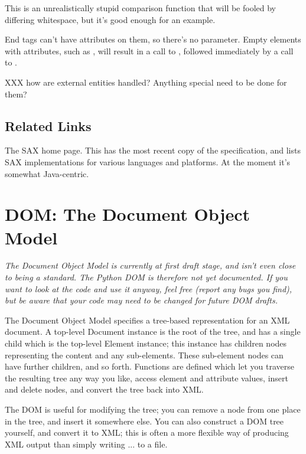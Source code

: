 \documentclass{howto}
\begin{document}
This is an unrealistically stupid comparison function that will be
fooled by differing whitespace, but it's good enough for an example.

End tags can't have attributes on them, so there's no 
parameter.  Empty elements with attributes, such as , will result in a call to
, followed immediately by a call to .

XXX how are external entities handled?  Anything special need to be
done for them?

\subsection{Related Links}

\begin{definitions}
%
The SAX home page.  This has the most recent copy of the
specification, and lists SAX implementations for various languages and
platforms.  At the moment it's somewhat Java-centric.

\end{definitions}

\section{DOM: The Document Object Model}
\label{DOM}

\emph{The Document Object Model is currently at first draft stage, and 
isn't even close to being a standard.  The Python DOM is therefore not 
yet documented.  If you want to look at the code and use it anyway,
feel free (report any bugs you find), but be aware that your code may
need to be changed for future DOM drafts.}

The Document Object Model specifies a tree-based representation for an
XML document.  A top-level Document instance is the root of the tree,
and has a single child which is the top-level Element instance; this
instance has children nodes representing the content and any
sub-elements.  These sub-element nodes can have further children, and
so forth.  Functions are defined which let you traverse the resulting
tree any way you like, access element and attribute values, insert and
delete nodes, and convert the tree back into XML.

The DOM is useful for modifying the tree; you can remove a node from
one place in the tree, and insert it somewhere else.  You can also
construct a DOM tree yourself, and convert it to XML; this is often a
more flexible way of producing XML output than simply writing
... to a file.
\end{document}
